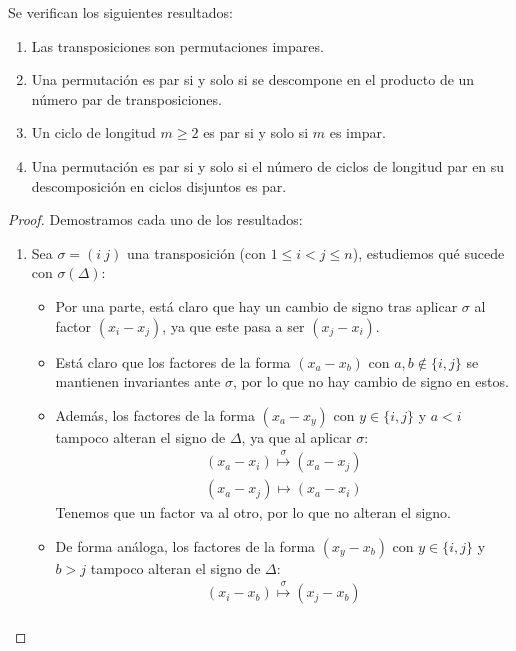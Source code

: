 \begin{prop}
    Se verifican los siguientes resultados:
    \begin{enumerate}
        \item Las transposiciones son permutaciones impares.
        \item Una permutación es par si y solo si se descompone en el producto de un número par de transposiciones.
        \item Un ciclo de longitud $m\geq 2$ es par si y solo si $m$ es impar.
        \item Una permutación es par si y solo si el número de ciclos de longitud par en su descomposición en ciclos disjuntos es par.
    \end{enumerate}
    \begin{proof}
        Demostramos cada uno de los resultados:
        \begin{enumerate}
            \item Sea $\sigma=(i\ j)$ una transposición (con $1\leq i <j\leq n$), estudiemos qué sucede con $\sigma(\Delta)$:
                \begin{itemize}
                    \item Por una parte, está claro que hay un cambio de signo tras aplicar $\sigma$ al factor $(x_i - x_j)$, ya que este pasa a ser $(x_j - x_i)$.
                    \item Está claro que los factores de la forma $(x_a - x_b)$ con $a,b \notin \{i,j\}$ se mantienen invariantes ante $\sigma$, por lo que no hay cambio de signo en estos.
                    \item Además, los factores de la forma $(x_a - x_y)$ con $y \in \{i,j\}$ y $a < i$ tampoco alteran el signo de $\Delta$, ya que al aplicar $\sigma$:
                        \begin{align*}
                            (x_a - x_i) \stackrel{\sigma}{\longmapsto} (x_a - x_j) \\
                            (x_a - x_j) \longmapsto (x_a - x_i) 
                        \end{align*}
                        Tenemos que un factor va al otro, por lo que no alteran el signo.
                    \item De forma análoga, los factores de la forma $(x_y - x_b)$ con $y \in \{i,j\}$ y $b > j$ tampoco alteran el signo de $\Delta$:
                        \begin{align*}
                            (x_i - x_b) \stackrel{\sigma}{\longmapsto} (x_j - x_b) \\

\end{align*}
\end{itemize}
\end{enumerate}
\end{proof}
\end{prop}

